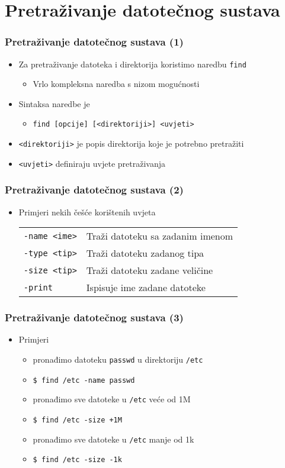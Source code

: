 \documentclass{beamer}
\newcommand{\shell}[1]{\texttt{#1}}
\begin{document}
\section{Pretraživanje datotečnog sustava}
\begin{frame}[t]
\frametitle{Pretraživanje datotečnog sustava (1)}
\begin{itemize}
  \item Za pretraživanje datoteka i direktorija koristimo naredbu
        \shell{find}
  \begin{itemize}
    \item Vrlo kompleksna naredba s nizom mogućnosti
  \end{itemize}
  \item Sintaksa naredbe je
  \begin{itemize}
    \item[] \shell{find [opcije] [<direktoriji>] <uvjeti>}
  \end{itemize}
  \item \shell{<direktoriji>} je popis direktorija koje je potrebno
        pretražiti
  \item \shell{<uvjeti>} definiraju uvjete pretraživanja
\end{itemize}
\end{frame}

\begin{frame}[t]
\frametitle{Pretraživanje datotečnog sustava (2)}
\begin{itemize}
  \item Primjeri nekih češće korištenih uvjeta
  \begin{tabular}{l l}
    \shell{-name <ime>} & Traži datoteku sa zadanim imenom  \\
    \shell{-type <tip>} & Traži datoteku zadanog tipa       \\
    \shell{-size <tip>} & Traži datoteku zadane veličine    \\
    \shell{-print}      & Ispisuje ime zadane datoteke
  \end{tabular}
\end{itemize}
\end{frame}

\begin{frame}[t]
\frametitle{Pretraživanje datotečnog sustava (3)}
\begin{itemize}
  \item Primjeri
  \begin{itemize}
    \item pronađimo datoteku \shell{passwd} u direktoriju \shell{/etc}
    \item[] \shell{\$ find /etc -name passwd}
    \item pronađimo sve datoteke u \shell{/etc} veće od 1M
    \item[] \shell{\$ find /etc -size +1M}
    \item pronađimo sve datoteke u \shell{/etc} manje od 1k
    \item[] \shell{\$ find /etc -size -1k}
  \end{itemize}
\end{itemize}
\end{frame}
\end{document}
